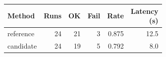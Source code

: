 \begin{tabular}{lrrrrr}
\hline
Method & Runs & OK & Fail & Rate & \shortstack{Latency\\(s)} \\
\hline
reference & 24 & 21 & 3 & 0.875 & 12.5 \\
candidate & 24 & 19 & 5 & 0.792 & 8.0 \\
\hline
\end{tabular}
